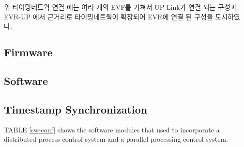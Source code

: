 \documentclass[journal,reqno]{IEEEtran}
\begin{document}
위 타이밍네트웍 연결 예는 여러 개의 EVF를 거쳐서 UP-Link가 연결 되는 구성과 EVR-UP 에서 근거리로 타이밍네트웍이 확장되어 EVR에 연결 된 구성을 도시하였다.

\subsection{Firmware}

\subsection{Software}

\subsection{Timestamp Synchronization}


\hfill\break
TABLE \ref{sw-conf} shows the software modules that used to incorporate a distributed process control system and a parallel processing control system.
\end{document}
